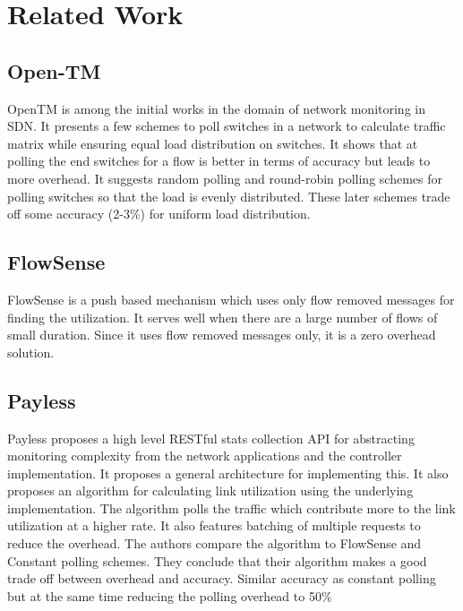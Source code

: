 \section{Related Work}


\subsection{Open-TM}
OpenTM\cite{opentm} is among the initial works in the domain of network monitoring in SDN. It presents a few schemes to poll switches in a network to calculate traffic matrix while ensuring equal load distribution on switches. It shows that at polling the end switches for a flow is better in terms of accuracy but leads to more overhead. It suggests random polling and round-robin polling schemes for polling switches so that the load is evenly distributed. These later schemes trade off some accuracy (2-3\%) for uniform load distribution.  

\subsection{FlowSense}
FlowSense is a push based mechanism which uses only flow removed messages for finding the utilization. It serves well when there are a large number of flows of small duration. Since it uses flow removed messages only, it is a zero overhead solution. 

\subsection{Payless}
Payless\cite{payless} proposes a high level RESTful stats collection API for abstracting monitoring complexity from the network applications and the controller implementation.
It proposes a general architecture for implementing this.
It also proposes an algorithm for calculating link utilization using the underlying implementation. The algorithm polls the traffic which contribute more to the link utilization at a higher rate. It also features batching of multiple requests to reduce the overhead.
The authors compare the algorithm to FlowSense\cite{flowsense} and Constant polling schemes. They conclude that their algorithm makes a good trade off between overhead and accuracy. Similar accuracy as constant polling but at the same time reducing the polling overhead to 50\%

